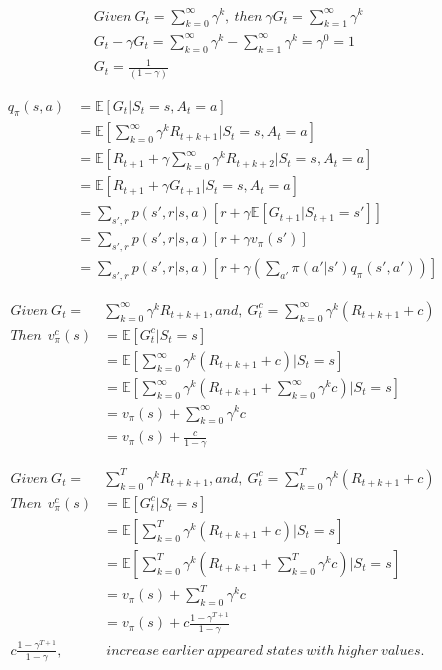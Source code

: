 \documentclass{article}
\begin{document}
\[
  \begin{aligned}
  &Given \ G_t = \sum_{k=0}^{\infty} \gamma^k, \ then \ \gamma G_t = \sum_{k=1}^{\infty} \gamma^k\\
  &G_t - \gamma G_t = \sum_{k=0}^{\infty} \gamma^k - \sum_{k=1}^{\infty} \gamma^k = \gamma^0 = 1\\
  &G_t = \frac {1} {(1 - \gamma)}
  \end{aligned}
\]

\[
  \begin{aligned}
    q_{\pi}(s,a) &= \mathbb{E}[G_t| S_{t}=s, A_{t}=a]\\
    &= \mathbb{E}[\sum_{k=0}^{\infty}\gamma^kR_{t+k+1} | S_{t}=s, A_{t}=a]\\
    &= \mathbb{E}[R_{t+1} + \gamma \sum_{k=0}^{\infty}\gamma^kR_{t+k+2} | S_{t}=s, A_{t}=a]\\
    &= \mathbb{E}[R_{t+1} + \gamma G_{t+1} | S_{t}=s, A_{t}=a]\\
    &= \sum_{s',r}p(s',r|s,a)[r + \gamma \mathbb{E}[ G_{t+1} | S_{t+1}=s']]\\
    &= \sum_{s',r}p(s',r|s,a)[r + \gamma v_\pi(s')]\\
    &= \sum_{s',r}p(s',r|s,a)[r + \gamma (\sum_{a'}\pi(a'|s') q_{\pi}(s',a'))]
  \end{aligned}
\]

\[
  \begin{aligned}
    Given \ G_t = &\sum_{k=0}^{\infty}\gamma^kR_{t+k+1}, and, \ G_t^c = \sum_{k=0}^{\infty}\gamma^k(R_{t+k+1} + c)\\
    Then \ \ v_{\pi}^c(s) &= \mathbb{E}[G_t^c | S_{t}=s]\\
    &= \mathbb{E}[\sum_{k=0}^{\infty}\gamma^k(R_{t+k+1} + c) | S_{t}=s]\\
    &= \mathbb{E}[\sum_{k=0}^{\infty}\gamma^k(R_{t+k+1} + \sum_{k=0}^{\infty}\gamma^kc) | S_{t}=s]\\
    &= v_{\pi}(s) + \sum_{k=0}^{\infty}\gamma^kc\\
    &= v_{\pi}(s) + \frac {c} {1-\gamma}
  \end{aligned}
\]

\[
  \begin{aligned}
    Given \ G_t = &\sum_{k=0}^{T}\gamma^kR_{t+k+1}, and, \ G_t^c = \sum_{k=0}^{T}\gamma^k(R_{t+k+1} + c)\\
    Then \ \ v_{\pi}^c(s) &= \mathbb{E}[G_t^c | S_{t}=s]\\
    &= \mathbb{E}[\sum_{k=0}^{T}\gamma^k(R_{t+k+1} + c) | S_{t}=s]\\
    &= \mathbb{E}[\sum_{k=0}^{T}\gamma^k(R_{t+k+1} + \sum_{k=0}^{T}\gamma^kc) | S_{t}=s]\\
    &= v_{\pi}(s) + \sum_{k=0}^{T}\gamma^kc\\
    &= v_{\pi}(s) + c\frac {1 - \gamma^{T+1}} {1-\gamma}\\
    c\frac {1 - \gamma^{T+1}} {1-\gamma}, &\ increase \ earlier \ appeared \ states \ with \ higher \ values.
  \end{aligned}
\]
\end{document}
